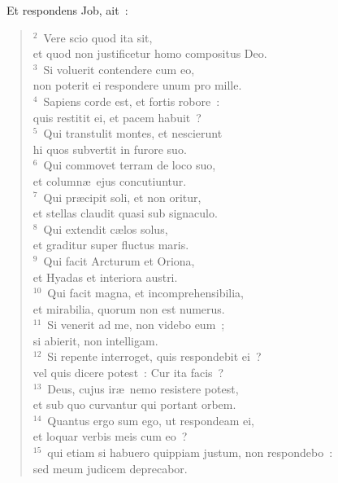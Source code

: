 ~\lettrine[lines=10,image=true,loversize=0.05,lraise=-0.03]{E}{}t respondens Job, ait~:
\begin{flushleft}\begin{verse}\vspace{6pt}${}^{2}$~Vere scio quod ita sit,\\ et quod non justificetur homo compositus Deo.\\
${}^{3}$~Si voluerit contendere cum eo,\\ non poterit ei respondere unum pro mille.\\
${}^{4}$~Sapiens corde est, et fortis robore~:\\ quis restitit ei, et pacem habuit~?\\
${}^{5}$~Qui transtulit montes, et nescierunt\\ hi quos subvertit in furore suo.\\
${}^{6}$~Qui commovet terram de loco suo,\\ et column\ae\ ejus concutiuntur.\\
${}^{7}$~Qui pr\ae cipit soli, et non oritur,\\ et stellas claudit quasi sub signaculo.\\
${}^{8}$~Qui extendit c\ae los solus,\\ et graditur super fluctus maris.\\
${}^{9}$~Qui facit Arcturum et Oriona,\\ et Hyadas et interiora austri.\\
${}^{10}$~Qui facit magna, et incomprehensibilia,\\ et mirabilia, quorum non est numerus.\\
${}^{11}$~Si venerit ad me, non videbo eum~;\\ si abierit, non intelligam.\\
${}^{12}$~Si repente interroget, quis respondebit ei~?\\ vel quis dicere potest~: Cur ita facis~?\\
${}^{13}$~Deus, cujus ir\ae\ nemo resistere potest,\\ et sub quo curvantur qui portant orbem.\\
${}^{14}$~Quantus ergo sum ego, ut respondeam ei,\\ et loquar verbis meis cum eo~?\\
${}^{15}$~qui etiam si habuero quippiam justum, non respondebo~:\\ sed meum judicem deprecabor.\\

\end{verse}
\end{flushleft}
